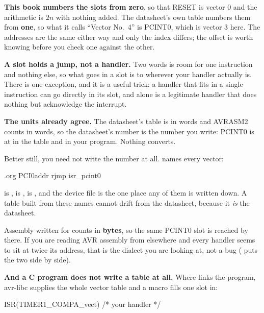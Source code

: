 \begin{aside}
\textbf{This book numbers the slots from zero}, so that RESET is vector 0 and the arithmetic is
$2n$ with nothing added. The datasheet's own table numbers them from \textbf{one}, so what it calls
``Vector No.~4'' is PCINT0, which is vector 3 here. The addresses are the same either way and only
the index differs; the offset is worth knowing before you check one against the other.
\end{aside}

\textbf{A slot holds a jump, not a handler.} Two words is room for one instruction and nothing
else, so what goes in a slot is  to wherever your handler actually is. There is one
exception, and it is a useful trick: a handler that fits in a single instruction can go directly
in its slot, and  alone is a legitimate handler that does nothing but acknowledge the
interrupt.

\textbf{The units already agree.} The datasheet's table is in words and AVRASM2 counts 
in words, so the datasheet's number is the number you write: PCINT0 is at  in the
table and  in your program. Nothing converts.

Better still, you need not write the number at all.  names every vector:

\begin{asm}
.org PCI0addr
    rjmp isr_pcint0
\end{asm}

 is ,  is ,  is
, and the device file is the one place any of them is written down. A table built
from these names cannot drift from the datasheet, because it \emph{is} the datasheet.

\begin{aside}
Assembly written for  counts  in \textbf{bytes}, so the same PCINT0 slot
is reached by  there. If you are reading AVR assembly from elsewhere and every
handler seems to sit at twice its address, that is the dialect you are looking at, not a bug
( puts the two side by side).
\end{aside}

\textbf{And a C program does not write a table at all.} Where  links the program,
avr-libc supplies the whole vector table and a macro fills one slot in:

\begin{cppcode}
ISR(TIMER1_COMPA_vect) { /* your handler */ }
\end{cppcode}

